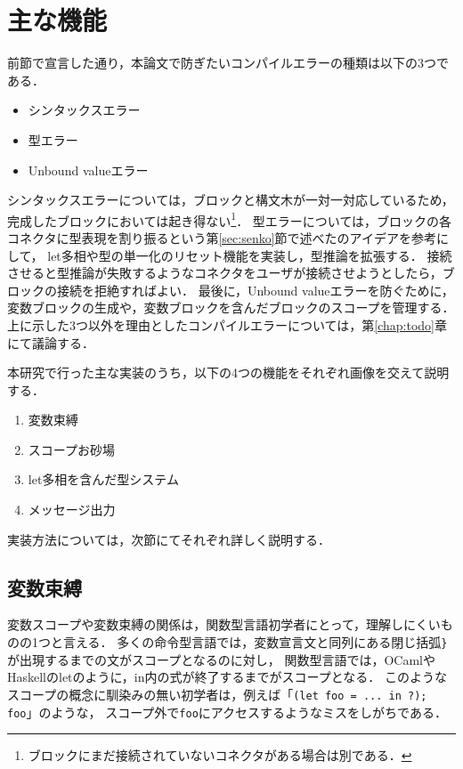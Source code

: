 \chapter{主な機能}\label{chap:features}

前節で宣言した通り，本論文で防ぎたいコンパイルエラーの種類は以下の3つである．
\begin {itemize}
  \item シンタックスエラー
  \item 型エラー
  \item Unbound valueエラー
\end {itemize}

シンタックスエラーについては，ブロックと構文木が一対一対応しているため，
完成したブロックにおいては起き得ない\footnote{ブロックにまだ接続されていないコネクタがある場合は別である．}．
型エラーについては，ブロックの各コネクタに型表現を割り振るという第\ref{sec:senko}節で述べた\cite{Typed-Blockly}のアイデアを参考にして，
let多相や型の単一化のリセット機能を実装し，型推論を拡張する．
接続させると型推論が失敗するようなコネクタをユーザが接続させようとしたら，ブロックの接続を拒絶すればよい．
最後に，Unbound valueエラーを防ぐために，変数ブロックの生成や，変数ブロックを含んだブロックのスコープを管理する．
上に示した3つ以外を理由としたコンパイルエラーについては，第\ref{chap:todo}章にて議論する．

本研究で行った主な実装のうち，以下の4つの機能をそれぞれ画像を交えて説明する．
\begin {enumerate}
  \item 変数束縛
  \item スコープお砂場
  \item let多相を含んだ型システム
  \item メッセージ出力
\end {enumerate}
実装方法については，次節にてそれぞれ詳しく説明する．

\section {変数束縛}
変数スコープや変数束縛の関係は，関数型言語初学者にとって，理解しにくいものの1つと言える．
多くの命令型言語では，変数宣言文と同列にある閉じ括弧{\tt \}}が出現するまでの文がスコープとなるのに対し，
関数型言語では，OCamlやHaskellのletのように，in内の式が終了するまでがスコープとなる．
このようなスコープの概念に馴染みの無い初学者は，例えば「{\tt (let foo = ...\ in ?); foo}」のような，
スコープ外で{\tt foo}にアクセスするようなミスをしがちである．

